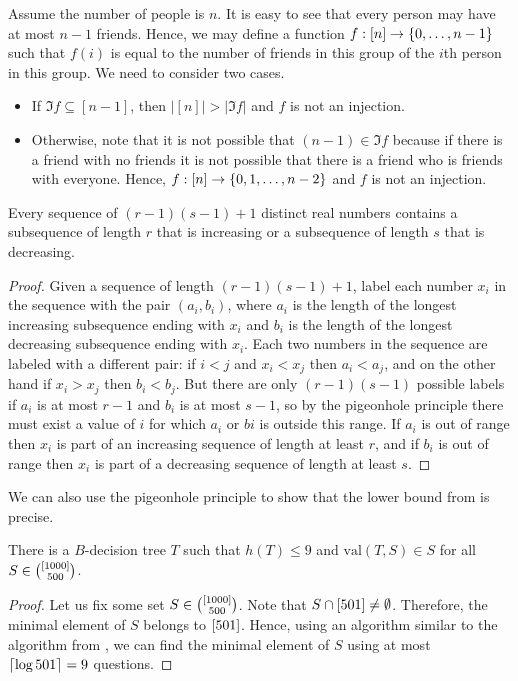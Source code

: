 Assume the number of people is $n$. It is easy to see that every person may
have at most $n - 1$ friends. Hence, we may define a function $f: \range{n} \to
\set{0, \dots, n - 1}$ such that $f(i)$ is equal to the number of friends in
this group of the $i$th person in this group.
We need to consider two cases.
\begin{itemize}
  \item If $\Im f \subseteq [n - 1]$, then
    $|[n]| > |\Im f|$ and $f$ is not an injection.
  \item Otherwise, note that it is not possible that $(n - 1) \in \Im f$
    because if there is a friend with no friends it is not possible that there
    is a friend who is friends with everyone. Hence,
    $f : \range{n} \to \set{0, 1, \dots, n - 2}$ and $f$ is not an injection.
\end{itemize}

\begin{theorem}
  Every sequence of $(r - 1)(s - 1) + 1$ distinct real numbers contains a
  subsequence of length $r$ that is increasing or a
  subsequence of length $s$ that is decreasing.
\end{theorem}
\begin{proof}
  Given a sequence of length $(r - 1)(s - 1) + 1$, label each number $x_i$ in
  the sequence with the pair $(a_i, b_i)$, where $a_i$ is the length of the
  longest increasing subsequence ending with $x_i$ and $b_i$ is
  the length of the longest decreasing subsequence ending with $x_i$.
  Each two numbers in the sequence are labeled with a different pair: if $i < j$
  and $x_i < x_j$ then $a_i < a_j$, and on the other hand if $x_i > x_j$ then
  $b_i < b_j$. But there are only $(r - 1)(s - 1)$ possible labels if $a_i$ is
  at most $r - 1$ and $b_i$ is at most $s - 1$, so by the pigeonhole principle
  there must exist a value of $i$ for which $a_i$ or $bi$ is outside this
  range. If $a_i$ is out of range then $x_i$ is part of an increasing sequence of
  length at least $r$, and if $b_i$ is out of range then $x_i$ is part of a
  decreasing sequence of length at least $s$.
\end{proof}

We can also use the pigeonhole principle to show that the lower bound from
 is precise.
\begin{theorem}
  There is a $B$-decision tree $T$ such that $h(T) \le 9$ and 
  $\mathrm{val}(T, S) \in S$ for all $S \in \binom{{[{1000}]}}{500}$.
\end{theorem}
\begin{proof}
  Let us fix some set $S \in \binom{{[{1000}]}}{500}$. Note that $S \cap
  {[{501}]} \neq \emptyset$. Therefore, the minimal element of $S$ belongs to
  ${[{501}]}$. Hence, using an algorithm similar to the algorithm from
  , we can find the minimal element of $S$
  using at most $\left\lceil {\log{501}} \right\rceil = 9$ questions.
\end{proof}

